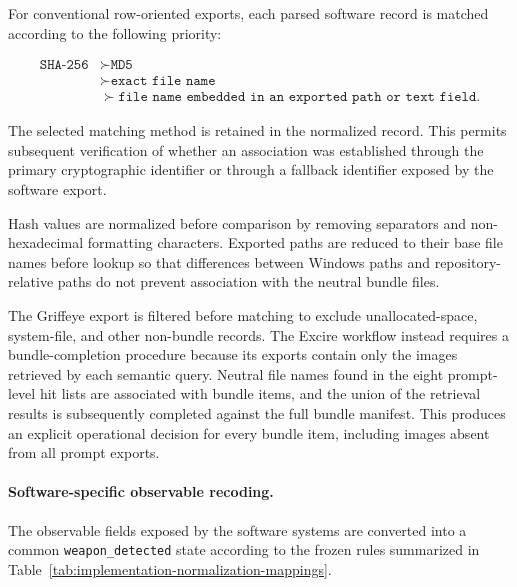 For conventional row-oriented exports, each parsed software record is matched
according to the following priority:

\[
\begin{aligned}
\texttt{SHA-256}
&\succ \texttt{MD5} \\
&\succ \texttt{exact file name} \\
&\succ \texttt{file name embedded in an exported path or text field}.
\end{aligned}
\]

The selected matching method is retained in the normalized record. This permits
subsequent verification of whether an association was established through the
primary cryptographic identifier or through a fallback identifier exposed by
the software export.

Hash values are normalized before comparison by removing separators and
non-hexadecimal formatting characters. Exported paths are reduced to their base
file names before lookup so that differences between Windows paths and
repository-relative paths do not prevent association with the neutral bundle
files.

The Griffeye export is filtered before matching to exclude unallocated-space,
system-file, and other non-bundle records. The Excire workflow instead requires
a bundle-completion procedure because its exports contain only the images
retrieved by each semantic query. Neutral file names found in the eight
prompt-level hit lists are associated with bundle items, and the union of the
retrieval results is subsequently completed against the full bundle manifest.
This produces an explicit operational decision for every bundle item, including
images absent from all prompt exports.

\paragraph{Software-specific observable recoding.}

The observable fields exposed by the software systems are converted into a
common \texttt{weapon\_detected} state according to the frozen rules summarized
in Table~\ref{tab:implementation-normalization-mappings}.

